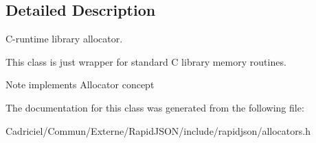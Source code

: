 \subsection{Detailed Description}
C-\/runtime library allocator. 

This class is just wrapper for standard C library memory routines. \begin{DoxyNote}{Note}
implements Allocator concept 
\end{DoxyNote}


The documentation for this class was generated from the following file\+:\begin{DoxyCompactItemize}
\item 
Cadriciel/\+Commun/\+Externe/\+Rapid\+J\+S\+O\+N/include/rapidjson/allocators.\+h\end{DoxyCompactItemize}
